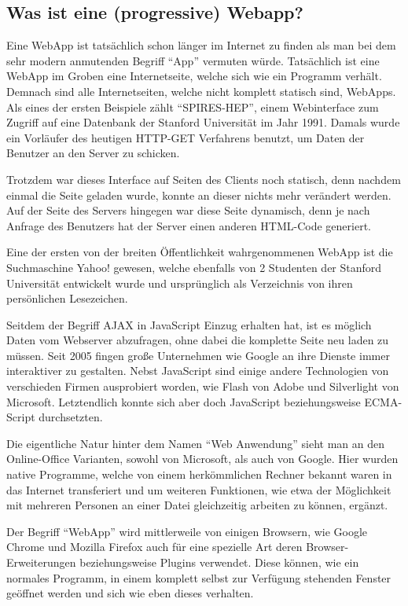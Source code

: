 \documentclass[a4paper,12pt,ngerman,listof=numbered]{scrartcl}      %
\let\oldcite\cite
\renewcommand{\cite}[1]{\textsuperscript{\oldcite{#1}}}
\begin{document}
	\subsection{Was ist eine (progressive) Webapp?}
	Eine WebApp ist tatsächlich schon länger im Internet zu finden als man bei dem sehr modern anmutenden Begriff ``App'' vermuten würde. Tatsächlich ist eine WebApp im Groben eine Internetseite, welche sich wie ein Programm verhält. Demnach sind alle Internetseiten, welche nicht komplett statisch sind, WebApps. Als eines der ersten Beispiele zählt ``SPIRES-HEP'', einem Webinterface zum Zugriff auf eine Datenbank der Stanford Universität im Jahr 1991. Damals wurde ein Vorläufer des heutigen HTTP-GET Verfahrens benutzt, um Daten der Benutzer an den Server zu schicken.\par
	Trotzdem war dieses Interface auf Seiten des Clients noch statisch, denn nachdem einmal die Seite geladen wurde, konnte an dieser nichts mehr verändert werden. Auf der Seite des Servers hingegen war diese Seite dynamisch, denn je nach Anfrage des Benutzers hat der Server einen anderen HTML-Code generiert.\par
	Eine der ersten von der breiten Öffentlichkeit wahrgenommenen WebApp ist die Suchmaschine Yahoo! gewesen, welche ebenfalls von 2 Studenten der Stanford Universität entwickelt wurde und ursprünglich als Verzeichnis von ihren persönlichen Lesezeichen.\cite{webappWiki}\par
	Seitdem der Begriff AJAX in JavaScript Einzug erhalten hat, ist es möglich Daten vom Webserver abzufragen, ohne dabei die komplette Seite neu laden zu müssen. Seit 2005 fingen große Unternehmen wie Google an ihre Dienste immer interaktiver zu gestalten. Nebst JavaScript sind einige andere Technologien von verschieden Firmen ausprobiert worden, wie Flash von Adobe und Silverlight von Microsoft. Letztendlich konnte sich aber doch JavaScript beziehungsweise ECMA-Script durchsetzten.\cite{webappWikiEN}\par
	Die eigentliche Natur hinter dem Namen ``Web Anwendung'' sieht man an den Online-Office Varianten, sowohl von Microsoft, als auch von Google. Hier wurden native Programme, welche von einem herkömmlichen Rechner bekannt waren in das Internet transferiert und um weiteren Funktionen, wie etwa der Möglichkeit mit mehreren Personen an einer Datei gleichzeitig arbeiten zu können, ergänzt.\par
	Der Begriff ``WebApp'' wird mittlerweile von einigen Browsern, wie Google Chrome und Mozilla Firefox auch für eine spezielle Art deren Browser-Erweiterungen beziehungsweise Plugins verwendet. Diese können, wie ein normales Programm, in einem komplett selbst zur Verfügung stehenden Fenster geöffnet werden und sich wie eben dieses verhalten.\cite{chromeWebStore}\par
\end{document}
